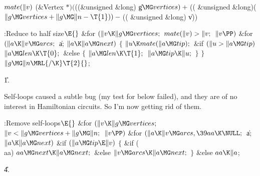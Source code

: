 \Y\B\4\D$\\{mate}(\|v)$ \5
(\&{Vertex} ${}{*})({}$((\&{unsigned} \&{long}) \|g${}\MG\\{vertices})+{}$((%
\&{unsigned} \&{long})(${}\|g\MG\\{vertices}+\|g\MG\|n-\T{1}))-{}$((%
\&{unsigned} \&{long}) \|v))\par
\Y\B\4:Reduce  to half size\X${}\E{}$\6
\&{for} ${}(\|v\K\|g\MG\\{vertices};{}$ ${}\\{mate}(\|v)>\|v;{}$ ${}\|v\PP){}$%
\1\6
\&{for} ${}(\|a\K\|v\MG\\{arcs};{}$ \|a; ${}\|a\K\|a\MG\\{next}){}$\5
${}\{{}$\1\6
${}\|u\K\\{mate}(\|a\MG\\{tip});{}$\6
\&{if} ${}(\|u>\|a\MG\\{tip}){}$\1\5
${}\|a\MG\\{len}\K\T{0};{}$\2\6
\&{else}\5
${}\{{}$\1\6
${}\|a\MG\\{len}\K\T{1};{}$\6
${}\|a\MG\\{tip}\K\|u;{}$\6
\4${}\}{}$\2\6
\4${}\}{}$\2\2\6
${}\|g\MG\|n\MRL{{/}{\K}}\T{2}{}$;\par
\U1.\fi

Self-loops caused a subtle bug (my test for  below
failed), and they are of no interest in Hamiltonian circuits. So
I'm now getting rid of them.

\Y\B\4:Remove self-loops\X${}\E{}$\6
\&{for} ${}(\|v\K\|g\MG\\{vertices};{}$ ${}\|v<\|g\MG\\{vertices}+\|g\MG\|n;{}$
${}\|v\PP){}$\1\6
\&{for} ${}(\|a\K\|v\MG\\{arcs},\39\\{aa}\K\NULL;{}$ \|a; ${}\|a\K\|a\MG%
\\{next}){}$\1\6
\&{if} ${}(\|a\MG\\{tip}\E\|v){}$\5
${}\{{}$\1\6
\&{if} (\\{aa})\1\5
${}\\{aa}\MG\\{next}\K\|a\MG\\{next};{}$\2\6
\&{else}\1\5
${}\|v\MG\\{arcs}\K\|a\MG\\{next};{}$\2\6
\4${}\}{}$\2\6
\&{else}\1\5
${}\\{aa}\K\|a{}$;\2\2\2\par
\U4.\fi

